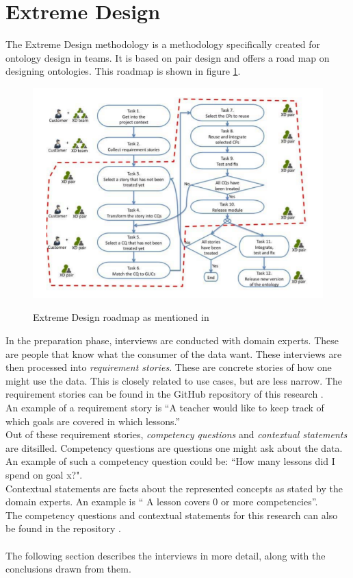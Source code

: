 \documentclass[a4paper]{report}
\begin{document}
    \section{Extreme Design}
    The Extreme Design methodology \cite{xd} is a methodology specifically created for ontology design in teams. It is based on pair design and offers a road map on designing ontologies. This roadmap is shown in figure \ref{fig:xd-diagram}.
    \begin{figure}
        \caption[Extreme Design roadmap]{Extreme Design roadmap as mentioned in \cite{xd}}
        \centering
        \includegraphics[scale=0.75]{xd-diagram.PNG}
        \label{fig:xd-diagram}
    \end{figure}
    In the preparation phase, interviews are conducted with domain experts. These are people that know what the consumer of the data want.
    These interviews are then processed into \textit{requirement stories}. These are concrete stories of how one might use the data. 
    This is closely related to use cases, but are less narrow. The requirement stories can be found in the GitHub repository of this research \cite{repo}. \\
    An example of a requirement story is ``A teacher would like to keep track of which goals are covered in which lessons.'' \\
    Out of these requirement stories, \textit{competency questions} and \textit{contextual statements} are ditsilled. Competency questions are questions one might ask about the data. An example of such a competency question could be: ``How many lessons did I spend on goal x?".\\
    Contextual statements are facts about the represented concepts as stated by the domain experts. An example is `` A lesson covers 0 or more competencies''.\\
    The competency questions and contextual statements for this research can also be found in the repository \cite{repo}. \\ \\
    The following section describes the interviews in more detail, along with the conclusions drawn from them.
\end{document}
